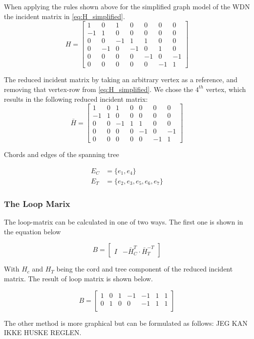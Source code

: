 When applying the rules shown above for the simplified graph model of the WDN the incident matrix in \cref{eq:H_simplified}.
\begin{equation}
    H = \begin{bmatrix}
1 & 0 & 1 & 0 & 0 & 0 & 0\\
-1 & 1 & 0 & 0 & 0 & 0 & 0\\
0 & 0 & -1 & 1 & 1 & 0 & 0\\
0 & -1 & 0 & -1 & 0 & 1 & 0\\
0 & 0 & 0 & 0 & -1 &  0  & -1\\
0 & 0 & 0 & 0 & 0 & -1 & 1
\end{bmatrix}
\label{eq:H_simplified}
\end{equation} %

The reduced incident matrix by taking an arbitrary vertex as a reference, and removing that vertex-row from \cref{eq:H_simplified}. We chose the $4^{th}$ vertex, which results in the following reduced incident matrix:
\begin{equation}
    \bar{H} = \begin{bmatrix}
1 & 0 & 1 & 0 & 0 & 0 & 0\\
-1 & 1 & 0 & 0 & 0 & 0 & 0\\
0 & 0 & -1 & 1 & 1 & 0 & 0\\
0 & 0 & 0 & 0 & -1 &  0  & -1\\
0 & 0 & 0 & 0 & 0 & -1 & 1
\end{bmatrix}
\end{equation}

Chords and edges of the spanning tree

\begin{equation*} 
	\begin{split}
E_{C} &= \{e_{1},e_{4}\}   \\ E_{T} &= \{e_2,e_3,e_5,e_6,e_7\}
	\end{split}
\end{equation*}


\subsubsection{The Loop Marix}
The loop-matrix can be calculated in one of two ways. The first one is shown in the equation below

\begin{equation}
    B = \begin{bmatrix}
I & -\bar{H}_{C}^{T}\cdot\bar{H}_{T}^{-T}
\end{bmatrix}
\end{equation}

With $H_{c}$ and $H_{T}$ being the cord and tree component of the reduced incident matrix. The result of loop matrix is shown below.

\begin{equation}
	B = \begin{bmatrix}
		1 & 0 & 1 & -1 & -1 & 1 & 1\\
		0 & 1 & 0 & 0 & -1 & 1 & 1\\
		\end{bmatrix}
\end{equation}

The other method is more graphical but can be formulated as follows: JEG KAN IKKE HUSKE REGLEN.
